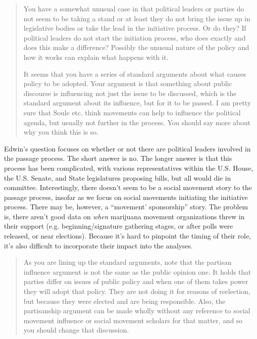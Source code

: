 \documentclass[12pt,stdletter,dateno,sigleft]{newlfm} %
\begin{document}
\begin{newlfm}
\begin{quotation}{\color{red}\noindent \footnotesize
You have a somewhat unusual case in that political leaders or parties do not seem to be taking a stand or at least they do not bring the issue up in legislative bodies or take the lead in the initiative process. Or do they?  If political leaders do not start the initiation process, who does exactly and does this make a difference?  Possibly the unusual nature of the policy and how it works can explain what happens with it. \newline

\noindent It seems that you have a series of standard arguments about what causes policy to be adopted.   Your argument is that something about public discourse is influencing not just the issue to be discussed, which is the standard argument about its influence, but for it to be passed.  I am pretty sure that Soule etc. think movements can help to influence the political agenda, but usually not further in the process. You should say more about why you think this is so.  
}
\end{quotation}

Edwin's question focuses on whether or not there are political leaders involved in the passage process. The short answer is no. The longer answer is that this process has been complicated, with various representatives within the U.S. House, the U.S. Senate, and State legislatures proposing bills, but all would die in committee. Interestingly, there doesn't seem to be a social movement story to the passage process, insofar as we focus on social movements initiating the initiative process. There may be, however, a ``movement' sponsorship'' story. The problem is, there aren't good data on \textit{when} marijuana movement organizations threw in their support (e.g. beginning/signature gathering stages, or after polls were released, or near elections). Because it's hard to pinpoint the timing of their role, it's also difficult to incorporate their impact into the analyses.


\begin{quotation}{\color{red}\noindent \footnotesize
As you are lining up the standard arguments, note that the partisan influence argument is not the same as the public opinion one. It holds that parties differ on issues of public policy and when one of them takes power they will adopt that policy.  They are not doing it for reasons of reelection, but because they were elected and are being responsible.  Also, the partisanship argument can be made wholly without any reference to social movement influence or social movement scholars for that matter, and so you should change that discussion.  

}
\end{quotation}
\end{newlfm}
\end{document}
